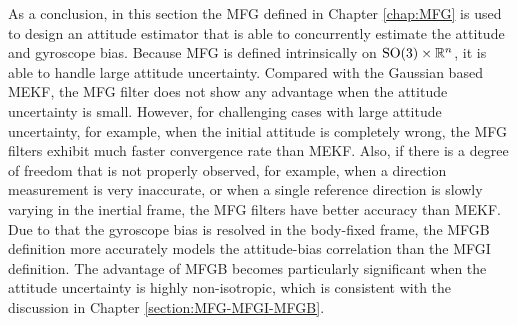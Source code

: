 As a conclusion, in this section the MFG defined in Chapter \ref{chap:MFG} is used to design an attitude estimator that is able to concurrently estimate the attitude and gyroscope bias.
Because MFG is defined intrinsically on $\mathrm{SO}(3)\times \mathbb{R}^n$, it is able to handle large attitude uncertainty.
Compared with the Gaussian based MEKF, the MFG filter does not show any advantage when the attitude uncertainty is small.
However, for challenging cases with large attitude uncertainty, for example, when the initial attitude is completely wrong, the MFG filters exhibit much faster convergence rate than MEKF.
Also, if there is a degree of freedom that is not properly observed, for example, when a direction measurement is very inaccurate, or when a single reference direction is slowly varying in the inertial frame, the MFG filters have better accuracy than MEKF.
Due to that the gyroscope bias is resolved in the body-fixed frame, the MFGB definition more accurately models the attitude-bias correlation than the MFGI definition.
The advantage of MFGB becomes particularly significant when the attitude uncertainty is highly non-isotropic, which is consistent with the discussion in Chapter \ref{section:MFG-MFGI-MFGB}.
